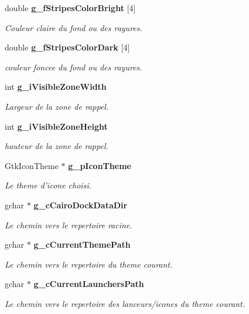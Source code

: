 \begin{CompactItemize}
double {\bf g\_\-fStripesColorBright} [4]
\begin{CompactList}\small\item\em Couleur claire du fond ou des rayures. \item\end{CompactList}\item 
double {\bf g\_\-fStripesColorDark} [4]
\begin{CompactList}\small\item\em couleur foncee du fond ou des rayures. \item\end{CompactList}\item 
int {\bf g\_\-iVisibleZoneWidth}
\begin{CompactList}\small\item\em Largeur de la zone de rappel. \item\end{CompactList}\item 
int {\bf g\_\-iVisibleZoneHeight}
\begin{CompactList}\small\item\em hauteur de la zone de rappel. \item\end{CompactList}\item 
GtkIconTheme $\ast$ {\bf g\_\-pIconTheme}
\begin{CompactList}\small\item\em Le theme d'icone choisi. \item\end{CompactList}\item 
gchar $\ast$ {\bf g\_\-cCairoDockDataDir}
\begin{CompactList}\small\item\em Le chemin vers le repertoire racine. \item\end{CompactList}\item 
gchar $\ast$ {\bf g\_\-cCurrentThemePath}
\begin{CompactList}\small\item\em Le chemin vers le repertoire du theme courant. \item\end{CompactList}\item 
gchar $\ast$ {\bf g\_\-cCurrentLaunchersPath}
\begin{CompactList}\small\item\em Le chemin vers le repertoire des lanceurs/icones du theme courant. \item\end{CompactList}\item 

\end{CompactItemize}
